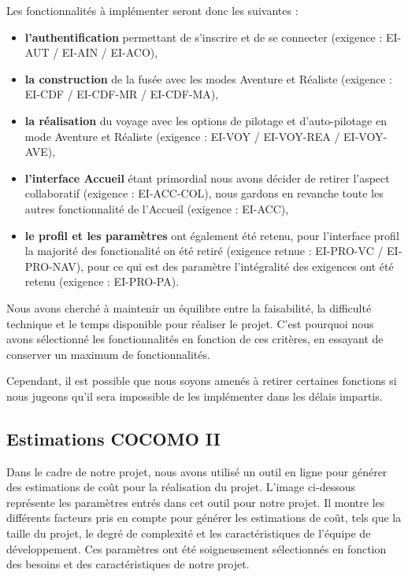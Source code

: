 \documentclass[a4paper, 12pt]{article}
\begin{document}
Les fonctionnalités à implémenter seront donc les suivantes : \\
\begin{itemize}
    \item \textbf{l'authentification} permettant de s'inscrire et de se connecter (exigence : EI-AUT / EI-AIN / EI-ACO), \\ 
    \item \textbf{la construction} de la fusée avec les modes Aventure et Réaliste (exigence : EI-CDF / EI-CDF-MR / EI-CDF-MA),\\
    \item \textbf{la réalisation} du voyage avec les options de pilotage et d'auto-pilotage en mode Aventure et Réaliste (exigence : EI-VOY / EI-VOY-REA / EI-VOY-AVE),\\
    \item \textbf{l'interface Accueil} étant primordial nous avons décider de retirer l'aspect collaboratif (exigence : EI-ACC-COL), nous gardons en revanche toute les autres fonctionnalité de l'Accueil (exigence : EI-ACC),\\
    \item \textbf{le profil et les paramètres} ont également été retenu, pour l'interface profil la majorité des fonctionalité on été retiré (exigence retnue :  EI-PRO-VC / EI-PRO-NAV), pour ce qui est des paramètre l'intégralité des exigences ont été retenu (exigence : EI-PRO-PA). \\
\end{itemize}

Nous avons cherché à maintenir un équilibre entre la faisabilité, la difficulté technique et le temps disponible pour réaliser le projet. C'est pourquoi nous avons sélectionné les fonctionnalités en fonction de ces critères, en essayant de conserver un maximum de fonctionnalités.

Cependant, il est possible que nous soyons amenés à retirer certaines fonctions si nous jugeons qu'il sera impossible de les implémenter dans les délais impartis.

\subsection{Estimations COCOMO II}

Dans le cadre de notre projet, nous avons utilisé un outil en ligne pour générer des estimations de coût pour la réalisation du projet. L'image ci-dessous représente les paramètres entrés dans cet outil pour notre projet. Il montre les différents facteurs pris en compte pour générer les estimations de coût, tels que la taille du projet, le degré de complexité et les caractéristiques de l'équipe de développement. Ces paramètres ont été soigneusement sélectionnés en fonction des besoins et des caractéristiques de notre projet.
\end{document}
